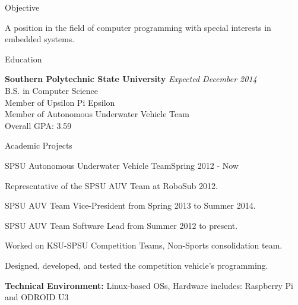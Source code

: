 \documentclass[11pt]{resume} %
\begin{document}
\begin{rSection}{Objective}

A position in the field of computer programming with special interests in embedded systems.

\end{rSection}


\begin{rSection}{Education}

{\bf Southern Polytechnic State University} \hfill {\em Expected December 2014} \\ 
B.S. in Computer Science \\%
Member of Upsilon Pi Epsilon \\
Member of Autonomous Underwater Vehicle Team \\
Overall GPA: 3.59

\end{rSection}

\begin{rSection}{Academic Projects}

\begin{rSubsection}{SPSU Autonomous Underwater Vehicle Team}{Spring 2012 - Now}{}{}

\item Representative of the SPSU AUV Team at RoboSub 2012.
\item SPSU AUV Team Vice-President from Spring 2013 to Summer 2014.
\item SPSU AUV Team Software Lead from Summer 2012 to present.
\item Worked on KSU-SPSU Competition Teams, Non-Sports consolidation team.
\item Designed, developed, and tested the competition vehicle's programming.
\item \textbf{Technical Environment:} Linux-based OSs, Hardware includes: Raspberry Pi and ODROID U3
\end{rSubsection}

\end{rSection}
\end{document}
